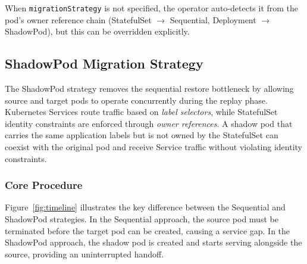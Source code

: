 \documentclass[conference]{IEEEtran}
\begin{document}
When \texttt{migrationStrategy} is not specified, the operator auto-detects it
from the pod's owner reference chain (StatefulSet $\to$ Sequential, Deployment
$\to$ ShadowPod), but this can be overridden explicitly.


\subsection{ShadowPod Migration Strategy}
\label{sec:shadowpod}

The ShadowPod strategy removes the sequential restore bottleneck by allowing
source and target pods to operate concurrently during the replay phase.
Kubernetes Services route traffic based on \textit{label selectors}, while
StatefulSet identity constraints are enforced through \textit{owner references}.
A shadow pod that carries the same application
labels but is not owned by the StatefulSet can coexist with the original pod
and receive Service traffic without violating identity constraints.

\subsubsection{Core Procedure}
\label{sec:shadowpod-core}

Figure~\ref{fig:timeline} illustrates the key difference between the Sequential
and ShadowPod strategies. In the Sequential approach, the source pod must be
terminated before the target pod can be created, causing a service gap. In the
ShadowPod approach, the shadow pod is created and starts serving alongside the
source, providing an uninterrupted handoff.
\end{document}
